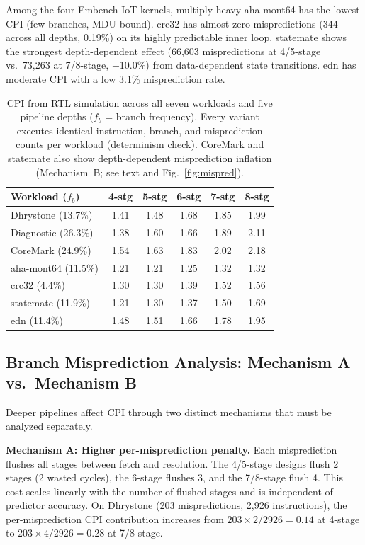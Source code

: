 \documentclass[acmsmall,nonacm,screen]{acmart}
\begin{document}
Among the four Embench-IoT kernels, multiply-heavy aha-mont64 has the lowest CPI (few branches, MDU-bound). crc32 has almost zero mispredictions (344 across all depths, 0.19\%) on its highly predictable inner loop. statemate shows the strongest depth-dependent effect (66{,}603 mispredictions at 4/5-stage vs.\ 73{,}263 at 7/8-stage, $+$10.0\%) from data-dependent state transitions. edn has moderate CPI with a low 3.1\% misprediction rate.

\begin{table}[t]
\centering
\caption{CPI from RTL simulation across all seven workloads and five pipeline depths ($f_b$ = branch frequency). Every variant executes identical instruction, branch, and misprediction counts per workload (determinism check). CoreMark and statemate also show depth-dependent misprediction inflation (Mechanism~B; see text and Fig.~\ref{fig:mispred}).}
\label{tab:cpi_all}
\small
\begin{tabular}{@{}lccccc@{}}
\toprule
\textbf{Workload ($f_b$)} & \textbf{4-stg} & \textbf{5-stg} & \textbf{6-stg} & \textbf{7-stg} & \textbf{8-stg} \\
\midrule
Dhrystone (13.7\%)  & 1.41 & 1.48 & 1.68 & 1.85 & 1.99 \\
Diagnostic (26.3\%) & 1.38 & 1.60 & 1.66 & 1.89 & 2.11 \\
CoreMark (24.9\%)   & 1.54 & 1.63 & 1.83 & 2.02 & 2.18 \\
aha-mont64 (11.5\%) & 1.21 & 1.21 & 1.25 & 1.32 & 1.32 \\
crc32 (4.4\%)       & 1.30 & 1.30 & 1.39 & 1.52 & 1.56 \\
statemate (11.9\%)  & 1.21 & 1.30 & 1.37 & 1.50 & 1.69 \\
edn (11.4\%)        & 1.48 & 1.51 & 1.66 & 1.78 & 1.95 \\
\bottomrule
\end{tabular}
\end{table}

\subsection{Branch Misprediction Analysis: Mechanism A vs.\ Mechanism B}
\label{sec:mispred}

Deeper pipelines affect CPI through two distinct mechanisms that must be analyzed separately.

\textbf{Mechanism A: Higher per-misprediction penalty.}
Each misprediction flushes all stages between fetch and resolution.
The 4/5-stage designs flush 2 stages (2 wasted cycles), the 6-stage flushes 3, and the 7/8-stage flush 4.
This cost scales linearly with the number of flushed stages and is independent of predictor accuracy.
On Dhrystone (203 mispredictions, 2{,}926 instructions), the per-misprediction CPI contribution increases from $203 \times 2 / 2926 = 0.14$ at 4-stage to $203 \times 4 / 2926 = 0.28$ at 7/8-stage.
\end{document}
